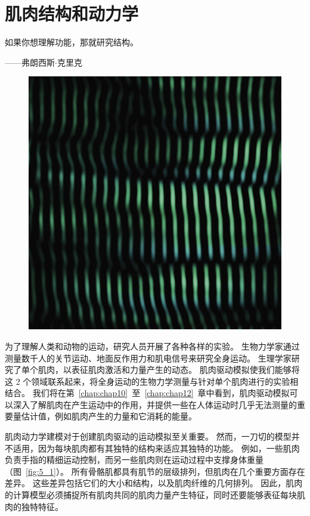 \chapter{肌肉结构和动力学} \label{chap:chap5}


如果你想理解功能，那就研究结构。

\begin{flushright}
	——弗朗西斯$\cdot$克里克
\end{flushright}


\begin{figure}[!htb]
	\centering
	\includegraphics[width=1.0\linewidth]{chap4/4_0}
	\caption*{ \label{fig:5_0}}
\end{figure}


为了理解人类和动物的运动，研究人员开展了各种各样的实验。
生物力学家通过测量数千人的关节运动、地面反作用力和肌电信号来研究全身运动。
生理学家研究了单个肌肉，以表征肌肉激活和力量产生的动态。
肌肉驱动模拟使我们能够将这 2 个领域联系起来，将全身运动的生物力学测量与针对单个肌肉进行的实验相结合。
我们将在第~\ref{chap:chap10}~至~\ref{chap:chap12}~章中看到，肌肉驱动模拟可以深入了解肌肉在产生运动中的作用，并提供一些在人体运动时几乎无法测量的重要量估计值，例如肌肉产生的力量和它消耗的能量。


肌肉动力学建模对于创建肌肉驱动的运动模拟至关重要。
然而，一刀切的模型并不适用，因为每块肌肉都有其独特的结构来适应其独特的功能。
例如，一些肌肉负责手指的精细运动控制，而另一些肌肉则在运动过程中支撑身体重量（图~\ref{fig:5_1}）。
所有骨骼肌都具有肌节的层级排列，但肌肉在几个重要方面存在差异。
这些差异包括它们的大小和结构，以及肌肉纤维的几何排列。
因此，肌肉的计算模型必须捕捉所有肌肉共同的肌肉力量产生特征，同时还要能够表征每块肌肉的独特特征。


